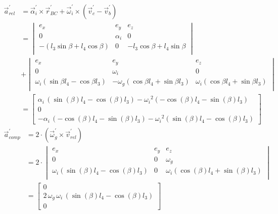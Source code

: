 \begin{equation}
\begin{split}
\vec{a}_{rel}^{'}&=\vec{\alpha}_{i}^{'}\times\vec{r}_{BC}^{'}+\vec{\omega}_{i}^{'}\times(\vec{v}_{c}^{'}-\vec{v}_{b}^{'})\\
&=\begin{vmatrix}
e_{x}&e_{y}&e_{z}\\
0&\alpha_{i}&0\\
-(l_{3}\sin{\beta}+l_{4}\cos{\beta})&0&-l_{3}\cos{\beta}+l_{4}\sin{\beta}\\
\end{vmatrix}\\
&+\begin{vmatrix}
e_{x}&e_{y}&e_{z}\\
0&\omega_{i}&0\\
\omega_{i}(\sin{\beta}l_{4}-\cos{\beta}l_{3})&-\omega_{g}(\cos{\beta}l_{4}+\sin{\beta}l_{3})&\omega_{i}(\cos{\beta}l_{4}+\sin{\beta}l_{3})\\
\end{vmatrix}\\
&=\left[ \begin {array}{c} \alpha_{i}\, \left( \sin \left( \beta
 \right) l_{4}-\cos \left( \beta \right) l_{3} \right) -{\omega_{i}}^{2} \left( -\cos \left( \beta \right) l_{4}-\sin \left( \beta \right) l_{3} \right) \\0\\ -\alpha_{i}\, \left( -\cos \left( \beta \right) l_{4}-\sin \left( \beta \right) l_{3} \right) -{\omega_{i}}^{2} \left( \sin \left( \beta \right) l_{4}-
\cos \left( \beta \right) l_{3} \right) \end {array} \right]
\end{split}
\label{eq:kin2.11}
\end{equation}
\begin{equation}
\begin{split}
\vec{a}_{comp}^{'}&=2\cdot(\vec{\omega}_{g}^{'}\times\vec{v}_{rel}^{'})\\
&=2\cdot
\begin{vmatrix}
e_{x}&e_{y}&e_{z}\\
0&0&\omega_{g}\\
\omega_{i}(\sin(\beta)l_{4}-\cos(\beta)l_{3})&0&\omega_{i}(\cos(\beta)l_{4}+\sin(\beta)l_{3})\\
\end{vmatrix}\\
&=\left[ \begin {array}{c} 0\\2\,\omega_{g}\,\omega_
{i}\, \left( \sin \left( \beta \right) l_{4}-\cos \left( \beta
 \right) l_{3} \right) \\ 0\end {array} \right]
\end{split}
\label{eq:kin2.12}
\end{equation}
